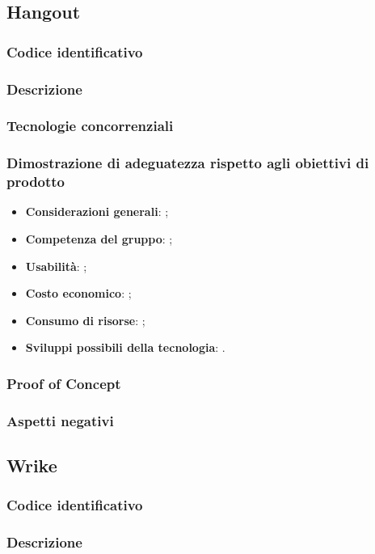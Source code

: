 \documentclass[./../Technology Baseline.tex]{subfiles}
\begin{document}
\subsection{Hangout}

\subsubsection{Codice identificativo}
\subsubsection{Descrizione}
\subsubsection{Tecnologie concorrenziali}
\subsubsection{Dimostrazione di adeguatezza rispetto agli obiettivi di prodotto}
\begin{itemize}
	\item \textbf{Considerazioni generali}: ;
	\item \textbf{Competenza del gruppo}: ;
	\item \textbf{Usabilità}: ;
	\item \textbf{Costo economico}: ;
	\item \textbf{Consumo di risorse}: ;
	\item \textbf{Sviluppi possibili della tecnologia}: .
\end{itemize}
\subsubsection{Proof of Concept}
\subsubsection{Aspetti negativi}

\subsection{Wrike}

\subsubsection{Codice identificativo}
\subsubsection{Descrizione}
\end{document}
